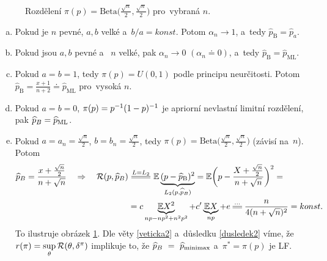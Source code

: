 \begin{example}
\begin{enumerate}[1)]
\begin{figure}[h]
			\caption{Rozdělení $\pi(p)=\mathrm{Beta}\big(\frac{\sqrt{n}}{2},\frac{\sqrt{n}}{2}\big)$ pro~vybraná $n$.}
			\label{fig:91}
		\end{figure}
		\begin{enumerate}[a)]
			\item Pokud je $n$ pevné, $a,b$ velké a~$b/a=konst$. Potom $\alpha_n\to1$, a~tedy $\widehat{p}_\mathrm{B}=\widehat{p}_a$.
			\item Pokud jsou $a,b$ pevné a~ $n$ velké, pak $\alpha_n\to0$ $(\alpha_n\doteq0)$, a~tedy $\widehat{p}_\mathrm{B}=\widehat{p}_\mathrm{ML}$.
			\item Pokud $a=b=1$, tedy $\pi(p)=U(0,1)$ podle principu neurčitosti. Potom $\widehat{p}_\mathrm{B}=\frac{x+1}{n+2}\doteq \widehat{p}_\mathrm{ML}$ pro~vysoká $n$.
			\item Pokud $a=b=0$, $\pi(p)=p^{-1}(1-p)^{-1}$ je apriorní nevlastní limitní rozdělení, pak $\widehat{p}_B=\widehat{p}_\mathrm{ML}$.
			\item Pokud $a=a_n=\frac{\sqrt{n}}{2}$, $b=b_n=\frac{\sqrt{n}}{2}$, tedy $\pi(p)=\mathrm{Beta}\big(\frac{\sqrt{n}}{2},\frac{\sqrt{n}}{2}\big)$ (závisí na~$n$). Potom
			\[
			\begin{split}
			\pB=\frac{x+\frac{\sqrt{n}}{2}}{n+\sqrt{n}}\quad\Rightarrow \quad\RF(p,\pB)&\equal{L=L_2}\E \underbrace{(p-\widehat{p}_\mathrm{B})^2}_{L_2(p,\pB)}=\E\bigg(p-\frac{X+\frac{\sqrt{n}}{2}}{n+\sqrt{n}}\bigg)^2=\\&=c\underbrace{\E X^2}_{np-np^2+n^2p^2}+c' \underbrace{\E X}_{np}+e\equal{...}\frac{n}{4(n+\sqrt{n})^2}=konst.
			\end{split}
			\] 
			To ilustruje obrázek \ref{fig:91}. Dle věty \ref{veticka2} a~důsledku \ref{dusledek2} víme, že $r(\pi)=\sup\limits_{\theta}\mathcal{R}(\theta,\delta^\pi)$ implikuje to, že $\widehat{p}_B~=~\widehat{p}_\mathrm{minimax}$ a~$\pi^\ast=\pi(p)$ je LF.
			
		\end{enumerate}
	\end{enumerate}
\end{example}	

